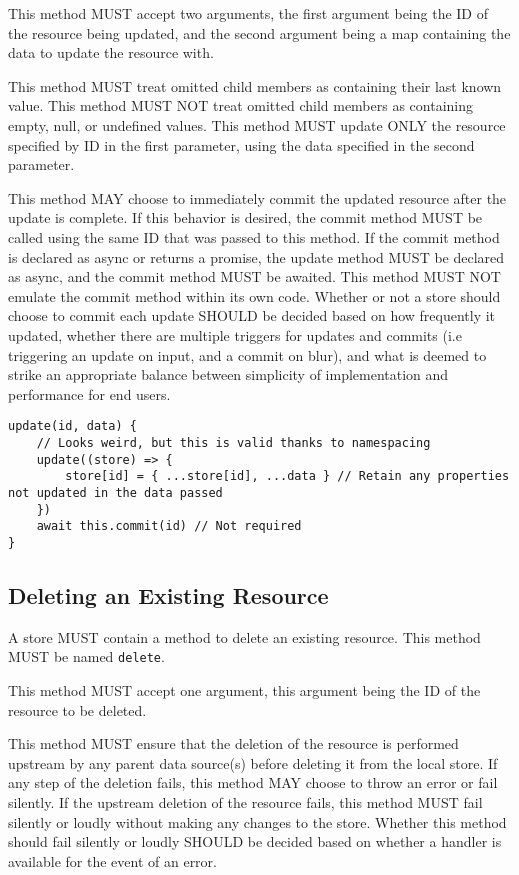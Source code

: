 \documentclass{article}
\begin{document}
This method MUST accept two arguments, the first argument being the ID of the resource being updated, and the second argument being a map containing the data to update the resource with.

This method MUST treat omitted child members as containing their last known value. This method MUST NOT treat omitted child members as containing empty, null, or undefined values. This method MUST update ONLY the resource specified by ID in the first parameter, using the data specified in the second parameter.

This method MAY choose to immediately commit the updated resource after the update is complete. If this behavior is desired, the commit method MUST be called using the same ID that was passed to this method. If the commit method is declared as async or returns a promise, the update method MUST be declared as async, and the commit method MUST be awaited. This method MUST NOT emulate the commit method within its own code. Whether or not a store should choose to commit each update SHOULD be decided based on how frequently it updated, whether there are multiple triggers for updates and commits (i.e triggering an update on input, and a commit on blur), and what is deemed to strike an appropriate balance between simplicity of implementation and performance for end users.

\begin{lstlisting}[caption=Update Method]
update(id, data) {
    // Looks weird, but this is valid thanks to namespacing
    update((store) => {
        store[id] = { ...store[id], ...data } // Retain any properties not updated in the data passed
    })
    await this.commit(id) // Not required
}
\end{lstlisting}

\subsection{Deleting an Existing Resource}
A store MUST contain a method to delete an existing resource. This method MUST be named \verb|delete|.

This method MUST accept one argument, this argument being the ID of the resource to be deleted.

This method MUST ensure that the deletion of the resource is performed upstream by any parent data source(s) before deleting it from the local store. If any step of the deletion fails, this method MAY choose to throw an error or fail silently. If the upstream deletion of the resource fails, this method MUST fail silently or loudly without making any changes to the store. Whether this method should fail silently or loudly SHOULD be decided based on whether a handler is available for the event of an error.
\end{document}
